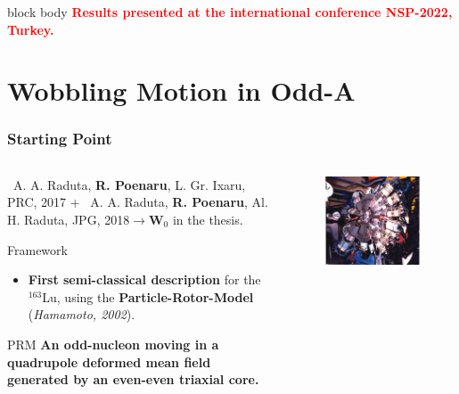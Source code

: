 \documentclass{beamer}
\begin{document}
\begin{frame}
\begin{figure}
	\end{figure}
	\vspace{-0.2cm}
	\begin{beamercolorbox}[rounded=true,shadow=false, wd=\linewidth,]{block body}
		\centering
		\textcolor{red}{\small{\textbf{Results presented at the international conference NSP-2022, Turkey.}}}
	\end{beamercolorbox}
\end{frame}

\section{Wobbling Motion in Odd-A}

\begin{frame}
	\frametitle{Starting Point}
	\begin{columns}
		\begin{column}{0.6\textwidth}
			{\footnotesize \faFile\ A. A. Raduta, \textbf{R. Poenaru}, L. Gr. Ixaru, PRC, 2017} + {\footnotesize \faFile\ A. A. Raduta, \textbf{R. Poenaru}, Al. H. Raduta, JPG, 2018}$\to${\footnotesize $\mathbf{W}_0$ in the thesis.}
			\begin{exampleblock}{Framework}
				\begin{itemize}
					\item \textbf{First semi-classical description} for the $^{163}$Lu, using the \textbf{Particle-Rotor-Model} (\textit{Hamamoto, 2002}).
				\end{itemize}
			\end{exampleblock}
			\begin{alertblock}{PRM}
				\textbf{An odd-nucleon moving in a quadrupole deformed mean field generated by an even-even triaxial core.}
			\end{alertblock}
		\end{column}
		\begin{column}{0.4\textwidth}
			\begin{figure}
				\centering
				\includegraphics[width=0.99\textwidth]{figures/euroball-4.jpg}

\end{figure}
\end{column}
\end{columns}
\end{frame}
\end{document}
